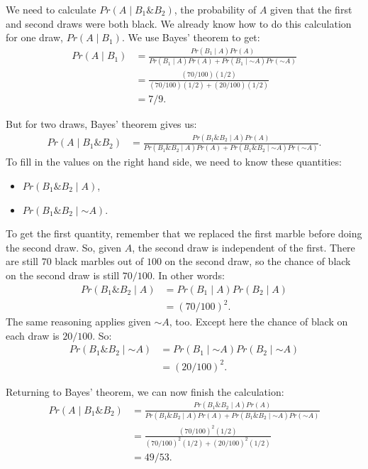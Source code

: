 \documentclass[justified]{tufte-book}
\providecommand{\tightlist}{%
  \setlength{\itemsep}{0pt}\setlength{\parskip}{0pt}}
\newcommand{\given}{\mid}
\renewcommand{\neg}{\mathbin{\sim}}
\renewcommand{\wedge}{\mathbin{\&}}
\newcommand{\p}{Pr}
\theoremstyle{definition}
\theoremstyle{definition}
\theoremstyle{definition}
\theoremstyle{remark}
\begin{document}
We need to calculate \(\p(A \given B_1 \wedge B_2)\), the probability of
\(A\) given that the first and second draws were both black. We already
know how to do this calculation for one draw, \(\p(A \given B_1)\). We
use Bayes' theorem to get: \[
  \begin{aligned}
    \p(A \given B_1) &= \frac{\p(B_1 \given A)\p(A)}{\p(B_1 \given A) \p(A) + \p(B_1 \given \neg A) \p(\neg A)} \\
      &= \frac{(70/100)(1/2)}{(70/100)(1/2) + (20/100)(1/2)}\\
      &= 7/9.
  \end{aligned}
\]

But for two draws, Bayes' theorem gives us: \[
  \begin{aligned}
    \p(A \given B_1 \wedge B_2) &= \frac{\p(B_1 \wedge B_2 \given A)\p(A)}{\p(B_1 \wedge B_2 \given A) \p(A) + \p(B_1 \wedge B_2 \given \neg A) \p(\neg A)}.
  \end{aligned}
\] To fill in the values on the right hand side, we need to know these
quantities:

\begin{itemize}
\tightlist
\item
  \(\p(B_1 \wedge B_2 \given A)\),
\item
  \(\p(B_1 \wedge B_2 \given \neg A)\).
\end{itemize}

To get the first quantity, remember that we replaced the first marble
before doing the second draw. So, given \(A\), the second draw is
independent of the first. There are still \(70\) black marbles out of
\(100\) on the second draw, so the chance of black on the second draw is
still \(70/100\). In other words: \[
  \begin{aligned}
    \p(B_1 \wedge B_2 \given A) &= \p(B_1 \given A) \p(B_2 \given A)\\
      &= (70/100)^2.
  \end{aligned}
\] The same reasoning applies given \(\neg A\), too. Except here the
chance of black on each draw is \(20/100\). So: \[
  \begin{aligned}
    \p(B_1 \wedge B_2 \given \neg A) &= \p(B_1 \given \neg A) \p(B_2 \given \neg A)\\
      &= (20/100)^2.
  \end{aligned}
\]

Returning to Bayes' theorem, we can now finish the calculation: \[
  \begin{aligned}
    \p(A \given B_1 \wedge B_2) &= \frac{\p(B_1 \wedge B_2 \given A)\p(A)}{\p(B_1 \wedge B_2 \given A) \p(A) + \p(B_1 \wedge B_2 \given \neg A) \p(\neg A)} \\ 
    &= \frac{(70/100)^2(1/2)}{(70/100)^2(1/2) + (20/100)^2(1/2)}\\
    &= 49/53.
  \end{aligned}
\]
\end{document}
